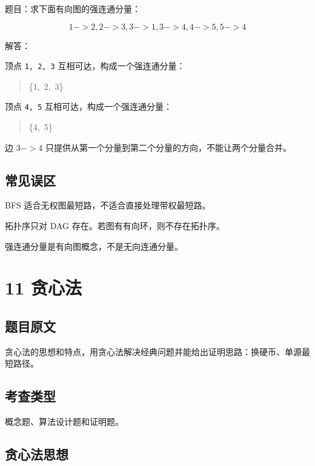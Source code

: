 \documentclass[UTF8,zihao=-4]{ctexart}
\begin{document}
题目：求下面有向图的强连通分量：

\[1->2, 2->3, 3->1, 3->4, 4->5, 5->4\]

解答：

顶点 \texttt{1, 2, 3} 互相可达，构成一个强连通分量：

\begin{quote}
\small\ttfamily\raggedright
\relax \{1,\ 2,\ 3\}\\
\end{quote}

顶点 \texttt{4, 5} 互相可达，构成一个强连通分量：

\begin{quote}
\small\ttfamily\raggedright
\relax \{4,\ 5\}\\
\end{quote}

边 $3->4$ 只提供从第一个分量到第二个分量的方向，不能让两个分量合并。

\subsection*{常见误区}

BFS 适合无权图最短路，不适合直接处理带权最短路。

拓扑序只对 DAG 存在。若图有有向环，则不存在拓扑序。

强连通分量是有向图概念，不是无向连通分量。

\newpage

\section*{11 贪心法}

\subsection*{题目原文}

贪心法的思想和特点，用贪心法解决经典问题并能给出证明思路：换硬币、单源最短路径。

\subsection*{考查类型}

概念题、算法设计题和证明题。

\subsection*{贪心法思想}
\end{document}
